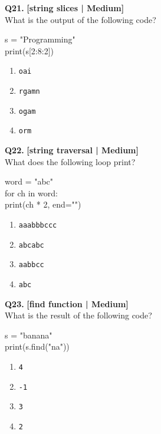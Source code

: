 \noindent\textbf{Q21.} \hfill {\small\color{LPUOrange}\textbf{[string slices | Medium]}}\\[2pt]
What is the output of the following code? 

\begin{pycode}
s = "Programming"\\
print(s[2:8:2])
\end{pycode}

\begin{enumerate}[label=(\alph*),topsep=2pt,itemsep=1pt,partopsep=0pt,parsep=0pt]
    \item \relax \texttt{oai}
    \item \relax \texttt{rgamn}
    \item \relax \texttt{ogam}
    \item \relax \texttt{orm}
\end{enumerate}
\vspace{2mm}

\noindent\textbf{Q22.} \hfill {\small\color{LPUOrange}\textbf{[string traversal | Medium]}}\\[2pt]
What does the following loop print? 

\begin{pycode}
word = "abc"\\
for ch in word:\\
print(ch * 2, end="")
\end{pycode}

\begin{enumerate}[label=(\alph*),topsep=2pt,itemsep=1pt,partopsep=0pt,parsep=0pt]
    \item \relax \texttt{aaabbbccc}
    \item \relax \texttt{abcabc}
    \item \relax \texttt{aabbcc}
    \item \relax \texttt{abc}
\end{enumerate}
\vspace{2mm}

\noindent\textbf{Q23.} \hfill {\small\color{LPUOrange}\textbf{[find function | Medium]}}\\[2pt]
What is the result of the following code? 

\begin{pycode}
s = "banana"\\
print(s.find("na"))
\end{pycode}

\begin{enumerate}[label=(\alph*),topsep=2pt,itemsep=1pt,partopsep=0pt,parsep=0pt]
    \item \relax \texttt{4}
    \item \relax \texttt{-1}
    \item \relax \texttt{3}
    \item \relax \texttt{2}
\end{enumerate}
\vspace{2mm}

